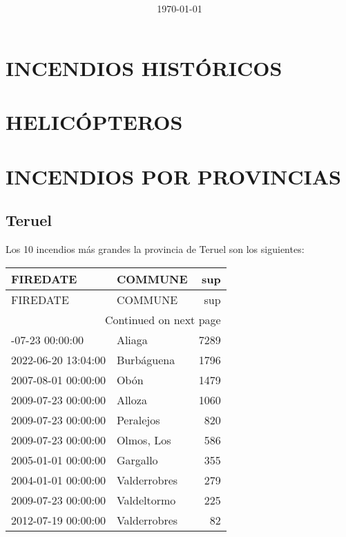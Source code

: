 \documentclass[spanish]{article}
\title{  }
\author{  }
\date{\today}
\begin{document}
\maketitle	
\pagebreak

\tableofcontents
\pagebreak



\section{INCENDIOS HISTÓRICOS}








\section{HELICÓPTEROS}








\section{INCENDIOS POR PROVINCIAS}

\subsection{Teruel}
Los 10 incendios más grandes la provincia de Teruel son los siguientes:
\begin{longtable}{llr}
\toprule
FIREDATE & COMMUNE & sup \\
\midrule
\endfirsthead
\toprule
FIREDATE & COMMUNE & sup \\
\midrule
\endhead
\midrule
\multicolumn{3}{r}{Continued on next page} \\
\midrule
\endfoot
\bottomrule
\endlastfoot
2009-07-23 00:00:00 & Aliaga & 7289 \\
2022-06-20 13:04:00 & Burbáguena & 1796 \\
2007-08-01 00:00:00 & Obón & 1479 \\
2009-07-23 00:00:00 & Alloza & 1060 \\
2009-07-23 00:00:00 & Peralejos & 820 \\
2009-07-23 00:00:00 & Olmos, Los & 586 \\
2005-01-01 00:00:00 & Gargallo & 355 \\
2004-01-01 00:00:00 & Valderrobres & 279 \\
2009-07-23 00:00:00 & Valdeltormo & 225 \\
2012-07-19 00:00:00 & Valderrobres & 82 \\
\end{longtable}
\end{document}
